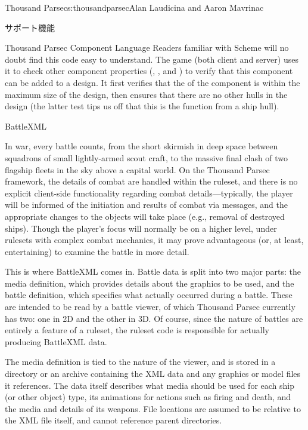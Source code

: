 \begin{aosachapter}{Thousand Parsec}{s:thousandparsec}{Alan Laudicina and Aaron Mavrinac}
\begin{aosasect1}{サポート機能}
\begin{aosasect2}{Thousand Parsec Component Language}
Readers familiar with Scheme will no doubt find this code easy to
understand. The game (both client and server) uses it to check other
component properties (, , and
) to verify that this component can be added to a
design. It first verifies that the  of the component is
within the maximum size of the design, then ensures that there are no
other hulls in the design (the latter test tips us off that this is
the  function from a ship hull).

\end{aosasect2}

\begin{aosasect2}{BattleXML}

In war, every battle counts, from the short skirmish in deep space
between squadrons of small lightly-armed scout craft, to the massive
final clash of two flagship fleets in the sky above a capital
world. On the Thousand Parsec framework, the details of combat are
handled within the ruleset, and there is no explicit client-side
functionality regarding combat details---typically, the player will be
informed of the initiation and results of combat via messages, and the
appropriate changes to the objects will take place (e.g., removal of
destroyed ships). Though the player's focus will normally be on a
higher level, under rulesets with complex combat mechanics, it may
prove advantageous (or, at least, entertaining) to examine the battle
in more detail.

This is where BattleXML comes in. Battle data is split into two major
parts: the media definition, which provides details about the graphics
to be used, and the battle definition, which specifies what actually
occurred during a battle. These are intended to be read by a battle
viewer, of which Thousand Parsec currently has two: one in 2D and the
other in 3D\@. Of course, since the nature of battles are entirely a
feature of a ruleset, the ruleset code is responsible for actually
producing BattleXML data.

The media definition is tied to the nature of the viewer, and is
stored in a directory or an archive containing the XML data and any
graphics or model files it references. The data itself describes what
media should be used for each ship (or other object) type, its
animations for actions such as firing and death, and the media and
details of its weapons. File locations are assumed to be relative to
the XML file itself, and cannot reference parent directories.


\end{aosasect2}
\end{aosasect1}
\end{aosachapter}
